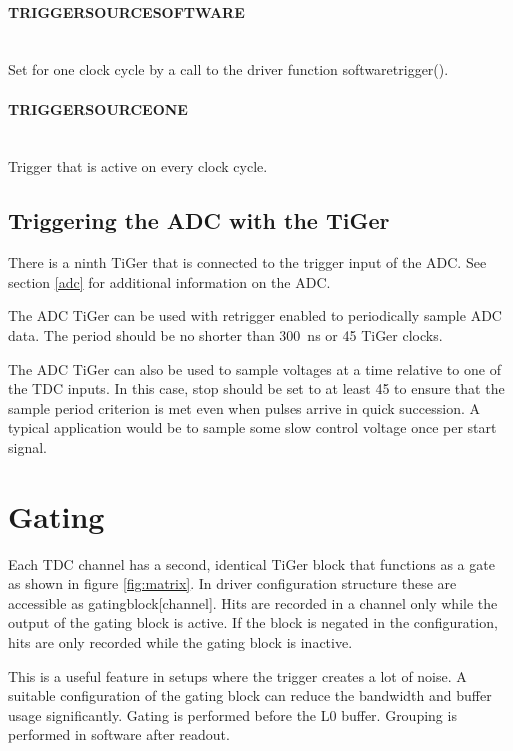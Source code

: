 {	\paragraph*{\textsf{\PREFIX TRIGGER\tu SOURCE\tu SOFTWARE}} \leavevmode \\
		Set for one clock cycle by a call to the driver function
		\textsf{\prefix software\tu trigger()}.
	\paragraph*{\textsf{\PREFIX TRIGGER\tu SOURCE\tu ONE}} \leavevmode \\
		Trigger that is active on every clock cycle.
	


	\subsection{Triggering the ADC with the TiGer}
		\label{adctiger}
		There is a ninth TiGer that is connected to the trigger input of the ADC. See section \ref{adc} for additional information on the ADC. 

		The ADC TiGer can be used with retrigger enabled to periodically sample ADC data. 
		The period should be no shorter than \SI{300}{\nano\second} or 45 TiGer clocks.

		The ADC TiGer can also be used to sample voltages at a time relative to one of the TDC inputs. In this case, 
		\textsf{stop} should be set to at least 45 to ensure that the sample period criterion is met even when pulses
		arrive in quick succession. A typical application would be to sample some slow control voltage once per start signal.

\newpage
	\section{Gating}
		Each TDC channel has a second, identical TiGer block that functions as a gate as shown in figure \ref{fig:matrix}. In driver configuration structure these are accessible as \textsf{gating\tu block[channel]}.
		Hits are recorded in a channel only while the output of the gating block is active.
		If the block is negated in the configuration, hits are only recorded while the gating block is inactive.
		
		This is a useful feature in setups where the trigger creates a lot of noise.
		A suitable configuration of the gating block can reduce the bandwidth and buffer usage significantly.
		Gating is performed before the L0 buffer. Grouping is performed in software after readout. 
		
}
